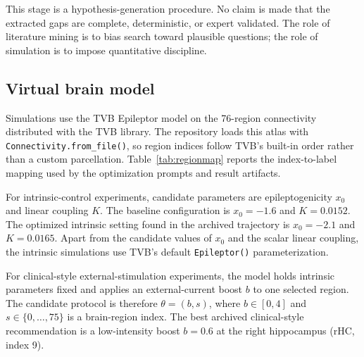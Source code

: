 \documentclass{article}
\begin{document}
This stage is a hypothesis-generation procedure. No claim is made that the extracted gaps are complete, deterministic, or expert validated. The role of literature mining is to bias search toward plausible questions; the role of simulation is to impose quantitative discipline.

\subsection{Virtual brain model}
Simulations use the TVB Epileptor model on the 76-region connectivity distributed with the TVB library. The repository loads this atlas with \texttt{Connectivity.from\_file()}, so region indices follow TVB's built-in order rather than a custom parcellation. Table~\ref{tab:regionmap} reports the index-to-label mapping used by the optimization prompts and result artifacts.

For intrinsic-control experiments, candidate parameters are epileptogenicity $x_0$ and linear coupling $K$. The baseline configuration is $x_0=-1.6$ and $K=0.0152$. The optimized intrinsic setting found in the archived trajectory is $x_0=-2.1$ and $K=0.0165$. Apart from the candidate values of $x_0$ and the scalar linear coupling, the intrinsic simulations use TVB's default \texttt{Epileptor()} parameterization.

For clinical-style external-stimulation experiments, the model holds intrinsic parameters fixed and applies an external-current boost $b$ to one selected region. The candidate protocol is therefore $\theta=(b,s)$, where $b\in[0,4]$ and $s\in\{0,\ldots,75\}$ is a brain-region index. The best archived clinical-style recommendation is a low-intensity boost $b=0.6$ at the right hippocampus (rHC, index 9).
\end{document}
